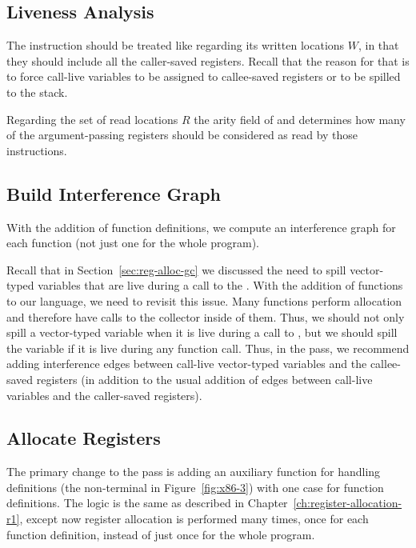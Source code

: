 \documentclass[11pt]{book}
\begin{document}
\subsection{Liveness Analysis}
\label{sec:liveness-analysis-r4}


The  instruction should be treated like
 regarding its written locations $W$, in that they should
include all the caller-saved registers. Recall that the reason for
that is to force call-live variables to be assigned to callee-saved
registers or to be spilled to the stack.

Regarding the set of read locations $R$ the arity field of
 and  determines how many of the
argument-passing registers should be considered as read by those
instructions.

\subsection{Build Interference Graph}
\label{sec:build-interference-r4}

With the addition of function definitions, we compute an interference
graph for each function (not just one for the whole program).

Recall that in Section~\ref{sec:reg-alloc-gc} we discussed the need to
spill vector-typed variables that are live during a call to the
.  With the addition of functions to our language, we
need to revisit this issue. Many functions perform allocation and
therefore have calls to the collector inside of them. Thus, we should
not only spill a vector-typed variable when it is live during a call
to , but we should spill the variable if it is live
during any function call. Thus, in the  pass,
we recommend adding interference edges between call-live vector-typed
variables and the callee-saved registers (in addition to the usual
addition of edges between call-live variables and the caller-saved
registers).


\subsection{Allocate Registers}

The primary change to the  pass is adding an
auxiliary function for handling definitions (the \Def{} non-terminal
in Figure~\ref{fig:x86-3}) with one case for function definitions. The
logic is the same as described in
Chapter~\ref{ch:register-allocation-r1}, except now register
allocation is performed many times, once for each function definition,
instead of just once for the whole program.
\end{document}
